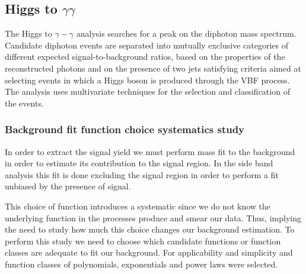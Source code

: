 \documentclass[%
reprint,
amsmath,
amssymb,
aps,
pra,
showkeys
]{revtex4-1}
\begin{document}
\subsection{Higgs to \texorpdfstring{$\gamma\gamma$}{gamma-gamma}}

The Higgs to $\gamma-\gamma$ analysis searches for a peak on the diphoton mass spectrum. Candidate diphoton events are 
separated into mutually exclusive categories of different expected signal-to-background ratios, based on the properties 
of the reconstructed photons and on the presence of two jets satisfying criteria aimed at selecting events in which 
a Higgs boson is produced through the VBF process. The analysis uses multivariate techniques for the selection and 
classification of the events.

\subsubsection{Background fit function choice systematics study}

In order to extract the signal yield we must perform mass fit to the background in order to estimate its contribution 
to the signal region. In the side band analysis this fit is done excluding the signal region in order to perform a 
fit unbiased by the presence of signal.

This choice of function introduces a systematic since we do not know the underlying function in the processes produce 
and smear our data. Thus, implying the need to study how much this choice changes our background estimation.
To perform this study we need to choose which candidate functions or function classes are adequate to fit our 
background. For applicability and simplicity and function classes of polynomials, exponentials and power laws were 
selected.
\end{document}
